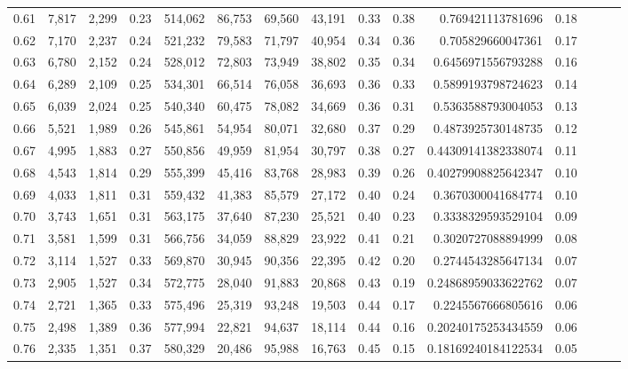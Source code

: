 \begin{tabular}{rrrrrrrrrrrrrrr}
0.61 &   7,817 &  2,299 &  0.23 &  514,062 &   86,753 &   69,560 &   43,191 &  0.33 &  0.38 &       0.769421113781696 &      0.18 \\
0.62 &   7,170 &  2,237 &  0.24 &  521,232 &   79,583 &   71,797 &   40,954 &  0.34 &  0.36 &       0.705829660047361 &      0.17 \\
0.63 &   6,780 &  2,152 &  0.24 &  528,012 &   72,803 &   73,949 &   38,802 &  0.35 &  0.34 &      0.6456971556793288 &      0.16 \\
0.64 &   6,289 &  2,109 &  0.25 &  534,301 &   66,514 &   76,058 &   36,693 &  0.36 &  0.33 &      0.5899193798724623 &      0.14 \\
0.65 &   6,039 &  2,024 &  0.25 &  540,340 &   60,475 &   78,082 &   34,669 &  0.36 &  0.31 &      0.5363588793004053 &      0.13 \\
0.66 &   5,521 &  1,989 &  0.26 &  545,861 &   54,954 &   80,071 &   32,680 &  0.37 &  0.29 &      0.4873925730148735 &      0.12 \\
0.67 &   4,995 &  1,883 &  0.27 &  550,856 &   49,959 &   81,954 &   30,797 &  0.38 &  0.27 &     0.44309141382338074 &      0.11 \\
0.68 &   4,543 &  1,814 &  0.29 &  555,399 &   45,416 &   83,768 &   28,983 &  0.39 &  0.26 &     0.40279908825642347 &      0.10 \\
0.69 &   4,033 &  1,811 &  0.31 &  559,432 &   41,383 &   85,579 &   27,172 &  0.40 &  0.24 &      0.3670300041684774 &      0.10 \\
0.70 &   3,743 &  1,651 &  0.31 &  563,175 &   37,640 &   87,230 &   25,521 &  0.40 &  0.23 &      0.3338329593529104 &      0.09 \\
0.71 &   3,581 &  1,599 &  0.31 &  566,756 &   34,059 &   88,829 &   23,922 &  0.41 &  0.21 &      0.3020727088894999 &      0.08 \\
0.72 &   3,114 &  1,527 &  0.33 &  569,870 &   30,945 &   90,356 &   22,395 &  0.42 &  0.20 &      0.2744543285647134 &      0.07 \\
0.73 &   2,905 &  1,527 &  0.34 &  572,775 &   28,040 &   91,883 &   20,868 &  0.43 &  0.19 &     0.24868959033622762 &      0.07 \\
0.74 &   2,721 &  1,365 &  0.33 &  575,496 &   25,319 &   93,248 &   19,503 &  0.44 &  0.17 &      0.2245567666805616 &      0.06 \\
0.75 &   2,498 &  1,389 &  0.36 &  577,994 &   22,821 &   94,637 &   18,114 &  0.44 &  0.16 &     0.20240175253434559 &      0.06 \\
0.76 &   2,335 &  1,351 &  0.37 &  580,329 &   20,486 &   95,988 &   16,763 &  0.45 &  0.15 &     0.18169240184122534 &      0.05 \\

\end{tabular}
